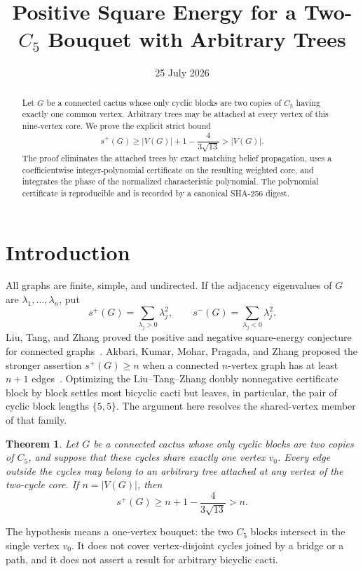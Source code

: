 \documentclass[11pt]{article}
\title{Positive Square Energy for a Two-$C_5$ Bouquet with Arbitrary Trees}
\author{}
\date{25 July 2026}
\newtheorem{theorem}{Theorem}[section]
\theoremstyle{remark}
\begin{document}
\maketitle

\begin{abstract}
Let $G$ be a connected cactus whose only cyclic blocks are two copies of
$C_5$ having exactly one common vertex.  Arbitrary trees may be attached at
every vertex of this nine-vertex core.  We prove the explicit strict bound
\[
 s^+(G)\geq |V(G)|+1-\frac{4}{3\sqrt{13}}>|V(G)|.
\]
The proof eliminates the attached trees by exact matching belief propagation,
uses a coefficientwise integer-polynomial certificate on the resulting
weighted core, and integrates the phase of the normalized characteristic
polynomial.  The polynomial certificate is reproducible and is recorded by a
canonical SHA-256 digest.
\end{abstract}

\section{Introduction}

All graphs are finite, simple, and undirected.  If the adjacency eigenvalues
of $G$ are $\lambda_1,\ldots,\lambda_n$, put
\[
 s^+(G)=\sum_{\lambda_j>0}\lambda_j^2,
 \qquad
 s^-(G)=\sum_{\lambda_j<0}\lambda_j^2.
\]
Liu, Tang, and Zhang proved the positive and negative square-energy
conjecture for connected graphs~\cite{LTZ}.  Akbari, Kumar, Mohar, Pragada,
and Zhang proposed the stronger assertion $s^+(G)\geq n$ when a connected
$n$-vertex graph has at least $n+1$ edges~\cite{AKMPZ}.  Optimizing the
Liu--Tang--Zhang doubly nonnegative certificate block by block settles most
bicyclic cacti but leaves, in particular, the pair of cyclic block lengths
$\{5,5\}$.  The argument here resolves the shared-vertex member of that
family.

\begin{theorem}\label{thm:main}
Let $G$ be a connected cactus whose only cyclic blocks are two copies of
$C_5$, and suppose that these cycles share exactly one vertex $v_0$.
Every edge outside the cycles may belong to an arbitrary tree attached at any
vertex of the two-cycle core.  If $n=|V(G)|$, then
\begin{equation}\label{eq:main}
 s^+(G)\geq n+1-\frac{4}{3\sqrt{13}}>n.
\end{equation}
\end{theorem}

The hypothesis means a one-vertex bouquet: the two $C_5$ blocks intersect in
the single vertex $v_0$.  It does not cover vertex-disjoint cycles joined by a
bridge or a path, and it does not assert a result for arbitrary bicyclic
cacti.
\end{document}
